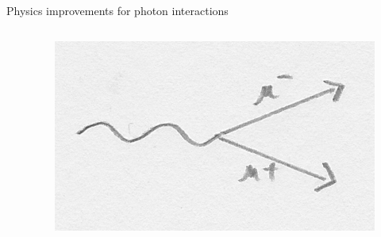 \documentclass[t]{beamer}
\begin{document}
\begin{columns}[onlytextwidth]
\begin{column}{\textwidth}
\begin{block}{Physics improvements for photon interactions}
\begin{minipage}[t]{0.3\textwidth}
\begin{minipage}[t][12cm]{\textwidth}
\begin{columns}[onlytextwidth]
\begin{column}{0.6\textwidth}
\begin{itemize}[leftmargin=0.5cm]
                  \end{itemize}
                \end{column}
                \begin{column}{0.35\textwidth}%
                  \begin{figure}
                      \includegraphics[width=\linewidth, keepaspectratio]{images/mupair_sketch.png}
                    \end{figure}
                \end{column}
            \end{columns}
          \end{minipage}
        \end{minipage}

      \end{block}
    \end{column}
    \end{columns}
\end{document}

